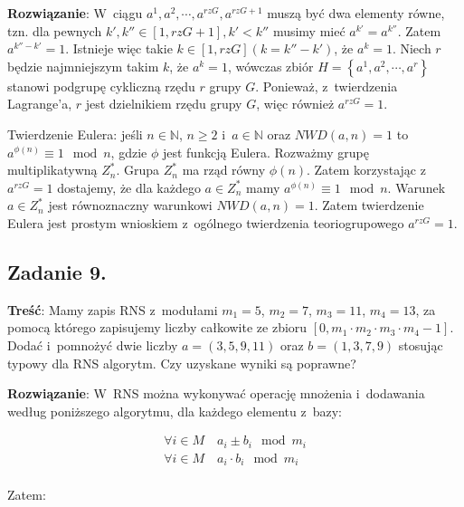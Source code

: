 \documentclass[a4paper,10pt, twocolumn]{article}
\begin{document}
\textbf{Rozwiązanie}: W~ciągu $a^{1}, a^{2}, \cdots, a^{rzG}, a^{rzG + 1}$ muszą być dwa elementy równe, tzn. dla pewnych $k', k'' \in [1, rzG + 1], k' < k''$ musimy mieć $a^{k'} = a^{k''}$. Zatem $a^{k'' - k'} = 1$. Istnieje więc takie $k \in [1, rzG] (k = k'' - k')$, że $a^{k} = 1$. Niech $r$ będzie najmniejszym takim $k$, że $a^{k} = 1$, wówczas zbiór $H = \left\{a^{1}, a^{2}, \cdots, a^{r}\right\}$ stanowi podgrupę cykliczną rzędu $r$ grupy $G$. Ponieważ, z~twierdzenia Lagrange'a, $r$ jest dzielnikiem rzędu grupy $G$, więc również $a^{rzG} = 1$.

\noindent Twierdzenie Eulera: jeśli $n \in \mathbb{N}$, $n \geq 2$ i~$a \in \mathbb{N}$ oraz $NWD(a, n) = 1$ to $a^{\phi(n)} \equiv 1 \mod n$, gdzie $\phi$ jest funkcją Eulera. Rozważmy grupę multiplikatywną $Z_{n}^{*}$. Grupa $Z_{n}^{*}$ ma rząd równy $\phi(n)$. Zatem korzystając z~$a^{rzG} = 1$ dostajemy, że dla każdego $a \in Z_{n}^{*}$ mamy $a^{\phi(n)} \equiv 1 \mod n$. Warunek $a \in Z_{n}^{*}$ jest równoznaczny warunkowi $NWD(a, n) = 1$. Zatem twierdzenie Eulera jest prostym wnioskiem z~ogólnego twierdzenia teoriogrupowego $a^{rzG} = 1$.

\subsection{Zadanie 9.}

\textbf{Treść}: Mamy zapis RNS z~modułami $m_{1} = 5$, $m_{2} = 7$, $m_{3} = 11$, $m_{4} = 13$, za pomocą którego zapisujemy liczby całkowite ze zbioru $[0, m_{1} \cdot m_{2} \cdot m_{3} \cdot m_{4} - 1]$. Dodać i~pomnożyć dwie liczby $a = (3, 5, 9, 11)$ oraz $b = (1, 3, 7, 9)$ stosując typowy dla RNS algorytm. Czy uzyskane wyniki są poprawne?

\textbf{Rozwiązanie}: W~RNS można wykonywać operację mnożenia i~dodawania według poniższego algorytmu, dla każdego elementu z~bazy:

\begin{equation*}
 \begin{array}{l} \forall i \in M \quad a_{i} \pm b_{i} \mod m_{i} \\ \forall i \in M \quad a_{i} \cdot b_{i} \mod m_{i} \\ \end{array}
\end{equation*}

\noindent Zatem:
\end{document}
